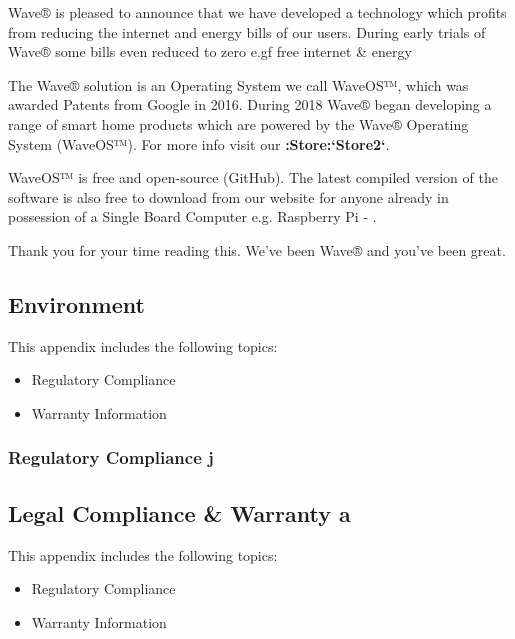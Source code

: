 \documentclass[letterpaper,10pt,openany,oneside,english]{sphinxmanual}
\begin{document}
Wave® is pleased to announce that we have developed a technology which profits from reducing the internet and energy bills of our users. During early trials of Wave® some bills even reduced to zero e.gf free internet \& energy

The Wave® solution is an Operating System we call WaveOS™, which was awarded Patents from Google in 2016. During 2018 Wave® began developing a range of smart home products which are powered by the Wave® Operating System (WaveOS™). For more info visit our {\color{red}\bfseries{}:Store:{}`Store2{}`}.

WaveOS™ is free and open-source (GitHub). The latest compiled version of the software is also free to download from our website for anyone already in possession of a Single Board Computer e.g. Raspberry Pi - .

Thank you for your time reading this.
We’ve been Wave® and you’ve been great.


\subsection{Environment}
\label{\detokenize{environment:environment}}\label{\detokenize{environment::doc}}
This appendix includes the following topics:
\begin{itemize}
\item {} 
Regulatory Compliance

\item {} 
Warranty Information

\end{itemize}


\subsubsection{Regulatory Compliance j}
\label{\detokenize{environment:regulatory-compliance-j}}

\subsection{Legal Compliance \& Warranty a}
\label{\detokenize{why:legal-compliance-warranty-a}}\label{\detokenize{why::doc}}
This appendix includes the following topics:
\begin{itemize}
\item {} 
Regulatory Compliance

\item {} 
Warranty Information

\end{itemize}
\end{document}

